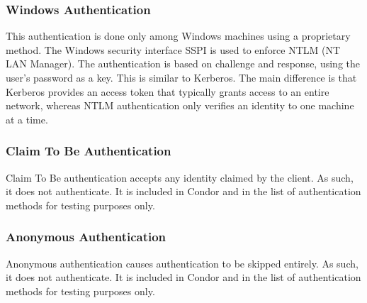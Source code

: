 
\subsubsection{\label{sec:NTSSPI-Authentication}Windows Authentication}
This authentication is done only among Windows machines using
a proprietary method.
The Windows security interface SSPI is used to enforce NTLM
(NT LAN Manager).
The authentication is based on challenge and response, using the user's
password as a key.
This is similar to Kerberos.
The main difference 
is that Kerberos provides an access token that typically grants
access to an entire network, whereas NTLM authentication only 
verifies an identity to one machine at a time.

\subsubsection{\label{sec:CLAIM-Authentication}Claim To Be Authentication}
Claim To Be authentication accepts any identity claimed by the client.
As such, it does not authenticate.
It is included in Condor and in the list of authentication methods
for testing purposes only.

\subsubsection{\label{sec:ANON-Authentication}Anonymous Authentication}
Anonymous authentication causes authentication to be skipped entirely.
As such, it does not authenticate.
It is included in Condor and in the list of authentication methods
for testing purposes only.

